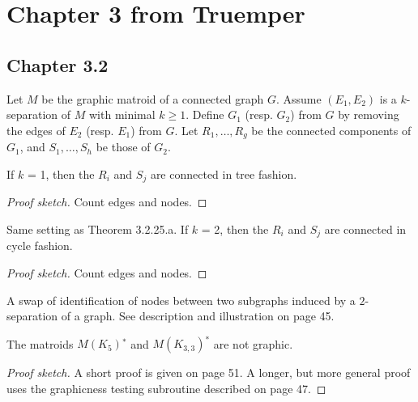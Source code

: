 \section{Chapter 3 from Truemper}

\subsection{Chapter 3.2}

\begin{theorem}[3.2.25.a]
  \label{thm:3.2.25.a}
  Let $M$ be the graphic matroid of a connected graph $G$. Assume $(E_{1}, E_{2})$ is a $k$-separation of $M$ with minimal $k \geq 1$. Define $G_{1}$ (resp. $G_{2}$) from $G$ by removing the edges of $E_{2}$ (resp. $E_{1}$) from $G$. Let $R_{1}, \dots, R_{g}$ be the connected components of $G_{1}$, and $S_{1}, \dots, S_{h}$ be those of $G_{2}$.

  If $k$ = 1, then the $R_{i}$ and $S_{j}$ are connected in tree fashion.
\end{theorem}

\begin{proof}[Proof sketch]
  Count edges and nodes.
\end{proof}

\begin{theorem}[3.2.25.b]
  \label{thm:3.2.25.b}
  Same setting as Theorem 3.2.25.a. If $k$ = 2, then the $R_{i}$ and $S_{j}$ are connected in cycle fashion.
\end{theorem}

\begin{proof}[Proof sketch]
  Count edges and nodes.
\end{proof}

\begin{definition}
  \label{switching op sec 3}
  A swap of identification of nodes between two subgraphs induced by a $2$-separation of a graph. See description and illustration on page 45.
\end{definition}

\begin{lemma}[3.2.48]
  \label{lem:3.2.48}
  The matroids $M(K_{5})^{∗}$ and $M(K_{3,3})^{∗}$ are not graphic.
\end{lemma}

\begin{proof}[Proof sketch]
  A short proof is given on page 51. A longer, but more general proof uses the graphicness testing subroutine described on page 47.
\end{proof}



